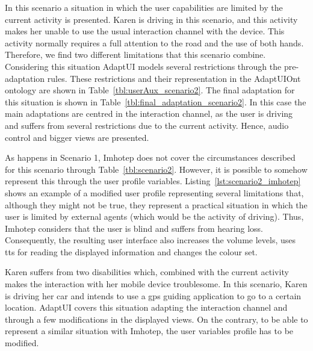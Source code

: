 \label{sec:scenario2_discussion}

In this scenario a situation in which the user capabilities are limited by the
current activity is presented. Karen is driving in this scenario, and this 
activity makes her unable to use the usual interaction channel with the device. 
This activity normally requires a full attention to the road and the 
use of both hands. Therefore, we find two different limitations that 
this scenario combine. Considering this situation AdaptUI models several 
restrictions through the pre-adaptation rules. These restrictions and their 
representation in the AdaptUIOnt ontology are shown in 
Table~\ref{tbl:userAux_scenario2}. The final adaptation for this situation is 
shown in Table~\ref{tbl:final_adaptation_scenario2}. In this case the main 
adaptations are centred in the interaction channel, as the user is driving and 
suffers from several restrictions due to the current activity. Hence, audio 
control and bigger views are presented.

As happens in Scenario 1, Imhotep does not cover the circumstances described 
for this scenario through Table~\ref{tbl:scenario2}. However, it is possible to
somehow represent this through the user profile variables. 
Listing~\ref{lst:scenario2_imhotep} shows an example of a modified user profile
representing several limitations that, although they might not be true, they
represent a practical situation in which the user is limited by external agents 
(which would be the activity of driving). Thus, Imhotep considers that the user 
is blind and suffers from hearing loss. Consequently, the resulting user interface
also increases the volume levels, uses \ac{tts} for reading the displayed
information and changes the colour set.

\label{sec:scenario2_conclusions}

Karen suffers from two disabilities which, combined with the current activity
makes the interaction with her mobile device troublesome. In this scenario, 
Karen is driving her car and intends to use a \ac{gps} guiding application to go to
a certain location. AdaptUI covers this situation adapting the interaction 
channel and through a few modifications in the displayed views. On the contrary, 
to be able to represent a similar situation with Imhotep, the user variables 
profile has to be modified.

